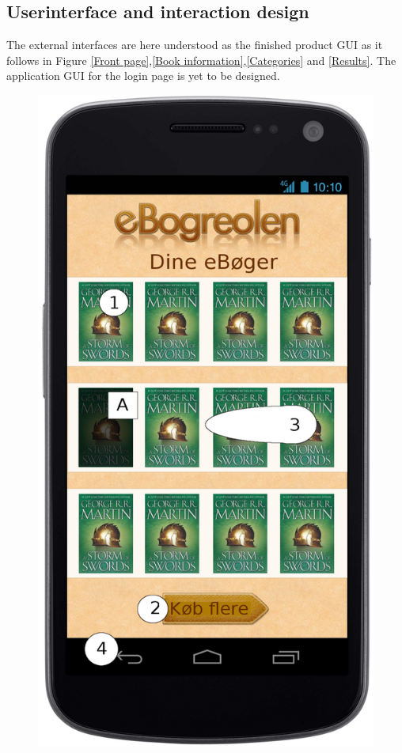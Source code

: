 \documentclass[12pt]{article}
\begin{document}
\subsection{Userinterface and interaction design}
The external interfaces are here understood as the finished product GUI as it follows in Figure \ref{Front page},\ref{Book information},\ref{Categories} and \ref{Results}. The application GUI for the login page is yet to be designed.
\begin{figure}
\includegraphics[scale=0.7]{gnexforside.png}

\end{figure}
\end{document}
